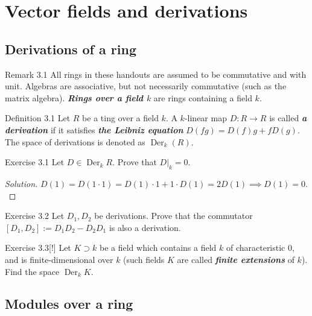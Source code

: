 \section{Vector fields and derivations}

\subsection{Derivations of a ring}

\begin{thing5}{Remark 3.1}\label{rk:3.1}\leavevmode
All rings in these handouts are assumed to be commutative and with unit. Algebras are associative, but not necessarily commutative (such as the matrix algebra). \textit{\textbf{Rings over a field \(k\)}} are rings containing a field \(k\).
\end{thing5}

\begin{thing3}{Definition 3.1}\label{def:3.1}\leavevmode
Let \(R\) be a ting over a field \(k\). A \(k\)-linear map \(D: R \to R\) is called \textit{\textbf{a derivation}} if it satisfies \textit{\textbf{the Leibniz equation}} \(D(fg)=D(f)g+fD(g)\). The space of derivations is denoted as \(\operatorname{Der}_k(R)\).
\end{thing3}

\begin{thing4}{Exercise 3.1}\label{exer:3.1}\leavevmode
Let \(D \in \operatorname{Der}_kR\). Prove that \(D|_{k}=0\).
\end{thing4}

\begin{proof}[Solution]\leavevmode
\(D(1)=D(1\cdot 1)=D(1)\cdot 1+1\cdot D(1)=2D(1) \implies D(1)=0.\)
\end{proof}

\begin{thing4}{Exercise 3.2}\label{exer:3.2}\leavevmode
Let \(D_1,D_2\) be derivations. Prove that the commutator \([D_1,D_2]:=D_1D_2-D_2D_1\) is also a derivation.
\end{thing4}

\begin{thing4}{Exercise 3.3}[!]\label{exer:3.3}\leavevmode
Let \(K \supset k\) be a field which contains a field \(k\) of characteristic 0, and is finite-dimensional over \(k\) (such fields \(K\) are called \textit{\textbf{finite extensions}} of \(k\)). Find the space \(\operatorname{Der}_k K\).
\end{thing4}

\subsection{Modules over a ring}

